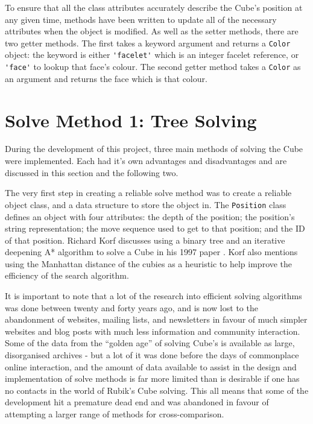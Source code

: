\documentclass{report}
\newenvironment{aside}
{\begin{mdframed}[style=0,%
		leftline=false,rightline=false,leftmargin=2em,rightmargin=2em,%
		innerleftmargin=0pt,innerrightmargin=0pt,linewidth=0.75pt,%
		skipabove=7pt,skipbelow=7pt]\small}
	{\end{mdframed}}
\begin{document}
    To ensure that all the class attributes accurately describe the Cube's position at any given time, methods have been written to update all of the necessary attributes when the object is modified. As well as the setter methods, there are two getter methods. The first takes a keyword argument and returns a \lstinline|Color| object: the keyword is either \lstinline|'facelet'| which is an integer facelet reference, or \lstinline|'face'| to lookup that face's colour. The second getter method takes a \lstinline|Color| as an argument and returns the face which is that colour.
    
    \section{Solve Method 1: Tree Solving}
    
    During the development of this project, three main methods of solving the Cube were implemented. Each had it's own advantages and disadvantages and are discussed in this section and the following two.
    
    The very first step in creating a reliable solve method was to create a reliable object class, and a data structure to store the object in. The \lstinline|Position| class defines an object with four attributes: the depth of the position; the position's string representation; the move sequence used to get to that position; and the ID of that position. Richard Korf discusses using a binary tree and an iterative deepening A* algorithm to solve a Cube in his 1997 paper \cite{Korf1997}. Korf also mentions using the Manhattan distance of the cubies as a heuristic to help improve the efficiency of the search algorithm. 
    
   	\begin{aside}
   		    It is important to note that a lot of the research into efficient solving algorithms was done between twenty and forty years ago, and is now lost to the abandonment of websites, mailing lists, and newsletters in favour of much simpler websites and blog posts with much less information and community interaction. Some of the data from the \enquote{golden age} of solving Cube's is available as large, disorganised archives  - but a lot of it was done before the days of commonplace online interaction, and the amount of data available to assist in the design and implementation of solve methods is far more limited than is desirable if one has no contacts in the world of Rubik's Cube solving. This all means that some of the development hit a premature dead end and was abandoned in favour of attempting a larger range of methods for cross-comparison.
   	\end{aside}
\end{document}
